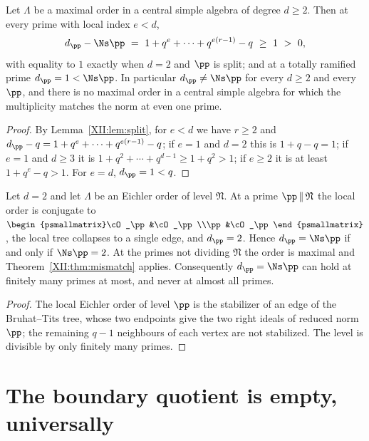 \begin{theorem}\label{XII:thm:mismatch}
Let $\Lambda$ be a maximal order in a central simple algebra of degree $d\ge2$. Then at every
prime with local index $e<d$,
\[
d_\pp-\Ns\pp\ =\ 1+q^e+\cdots+q^{e(r-1)}-q\ \ge\ 1\ >\ 0 ,
\]
with equality to $1$ exactly when $d=2$ and $\pp$ is split; and at a totally ramified prime
$d_\pp=1<\Ns\pp$. In particular $d_\pp\ne\Ns\pp$ for every $d\ge2$ and every $\pp$, and there
is no maximal order in a central simple algebra for which the multiplicity matches the norm
at even one prime.
\end{theorem}

\begin{proof}
By Lemma~\ref{XII:lem:split}, for $e<d$ we have $r\ge2$ and $d_\pp-q=1+q^e+\cdots+q^{e(r-1)}-q$;
if $e=1$ and $d=2$ this is $1+q-q=1$; if $e=1$ and $d\ge3$ it is $1+q^2+\cdots+q^{d-1}\ge1+q^2>1$;
if $e\ge2$ it is at least $1+q^e-q>1$. For $e=d$, $d_\pp=1<q$.
\end{proof}

\begin{proposition}\label{XII:prop:eichler}
Let $d=2$ and let $\Lambda$ be an Eichler order of level $\mathfrak N$. At a prime
$\pp\,\|\,\mathfrak N$ the local order is conjugate to
$\begin{psmallmatrix}\cO_\pp&\cO_\pp\\\pp&\cO_\pp\end{psmallmatrix}$, the local tree collapses
to a single edge, and $d_\pp=2$. Hence $d_\pp=\Ns\pp$ if and only if $\Ns\pp=2$. At the
primes not dividing $\mathfrak N$ the order is maximal and Theorem~\ref{XII:thm:mismatch} applies.
Consequently $d_\pp=\Ns\pp$ can hold at finitely many primes at most, and never at almost all
primes.
\end{proposition}

\begin{proof}
The local Eichler order of level $\pp$ is the stabilizer of an edge of the Bruhat--Tits tree,
whose two endpoints give the two right ideals of reduced norm $\pp$; the remaining
$q-1$ neighbours of each vertex are not stabilized. The level is divisible by only finitely
many primes.
\end{proof}

\section{The boundary quotient is empty, universally}

